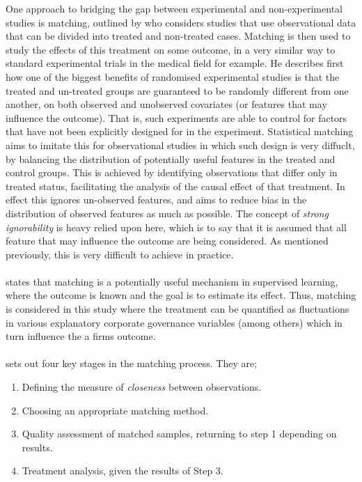 {One approach to bridging the gap between experimental and non-experimental studies is matching, outlined by \cite{stuart2010matching} who considers studies that use observational data that can be divided into treated and non-treated cases. Matching is then used to study the effects of this treatment on some outcome, in a very similar way to standard experimental trials in the medical field for example. He describes first how one of the biggest benefits of randomised experimental studies is that the treated and un-treated groups are guaranteed to be randomly different from one another, on both observed and unobserved covariates (or features that may influence the outcome). That is, such experiments are able to control for factors that have not been explicitly designed for in the experiment. Statistical matching aims to imitate this for observational studies in which such design is very diffuclt, by balancing the distribution of potentially useful features in the treated and control groups. This is achieved by identifying observations that differ only in treated status, facilitating the analysis of the causal effect of that treatment. In effect this ignores un-observed features, and aims to reduce bias in the distribution of observed features as much as possible. The concept of {\it strong ignorability} is heavy relied upon here, which is to say that it is assumed that all feature that may influence the outcome are being considered. As mentioned previously, this is very difficult to achieve in practice. \\\\
\cite {stuart2010matching} states that matching is a potentially useful mechanism in supervised learning, where the outcome is known and the goal is to estimate its effect. Thus, matching is considered in this study where the treatment can be quantified as fluctuations in various explanatory corporate governance variables (among others) which in turn influence the a firms outcome. \\\\
\cite {stuart2010matching} sets out four key stages in the matching process. They are;
\begin {enumerate}
\item{Defining the measure of {\it closeness} between observations.}
\item{Choosing an appropriate matching method.}
\item{Quality assessment of matched samples, returning to step 1 depending on results.}
\item{Treatment analysis, given the results of Step 3.}

\end{enumerate}}
